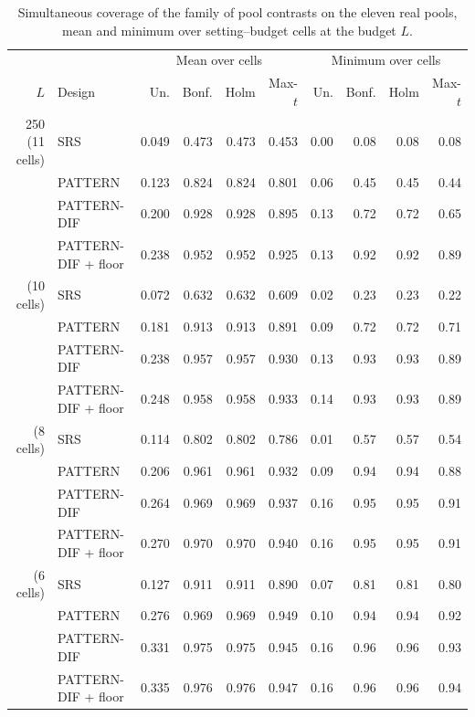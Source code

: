 \documentclass[pdflatex,sn-mathphys-num,iicol]{sn-jnl}
\theoremstyle{thmstyleone}
\theoremstyle{thmstyletwo}
\theoremstyle{thmstylethree}
\begin{document}
\begin{table}[t]
\centering\footnotesize
\caption{Simultaneous coverage of the family of pool contrasts on the eleven real pools, mean and minimum over setting--budget cells at the budget $L$.}\label{tab:test-real-cover-summary}
\begin{tabular}{rl rrrr rrrr}\toprule
 & & \multicolumn{4}{c}{Mean over cells} & \multicolumn{4}{c}{Minimum over cells} \\
$L$ & Design & Un. & Bonf. & Holm & Max-$t$ & Un. & Bonf. & Holm & Max-$t$ \\\midrule
250 (11 cells) & SRS & 0.049 & 0.473 & 0.473 & 0.453 & 0.00 & 0.08 & 0.08 & 0.08 \\
 & PATTERN & 0.123 & 0.824 & 0.824 & 0.801 & 0.06 & 0.45 & 0.45 & 0.44 \\
 & PATTERN-DIF & 0.200 & 0.928 & 0.928 & 0.895 & 0.13 & 0.72 & 0.72 & 0.65 \\
 & PATTERN-DIF + floor & 0.238 & 0.952 & 0.952 & 0.925 & 0.13 & 0.92 & 0.92 & 0.89 \\
\addlinespace
500 (10 cells) & SRS & 0.072 & 0.632 & 0.632 & 0.609 & 0.02 & 0.23 & 0.23 & 0.22 \\
 & PATTERN & 0.181 & 0.913 & 0.913 & 0.891 & 0.09 & 0.72 & 0.72 & 0.71 \\
 & PATTERN-DIF & 0.238 & 0.957 & 0.957 & 0.930 & 0.13 & 0.93 & 0.93 & 0.89 \\
 & PATTERN-DIF + floor & 0.248 & 0.958 & 0.958 & 0.933 & 0.14 & 0.93 & 0.93 & 0.89 \\
\addlinespace
1000 (8 cells) & SRS & 0.114 & 0.802 & 0.802 & 0.786 & 0.01 & 0.57 & 0.57 & 0.54 \\
 & PATTERN & 0.206 & 0.961 & 0.961 & 0.932 & 0.09 & 0.94 & 0.94 & 0.88 \\
 & PATTERN-DIF & 0.264 & 0.969 & 0.969 & 0.937 & 0.16 & 0.95 & 0.95 & 0.91 \\
 & PATTERN-DIF + floor & 0.270 & 0.970 & 0.970 & 0.940 & 0.16 & 0.95 & 0.95 & 0.91 \\
\addlinespace
2000 (6 cells) & SRS & 0.127 & 0.911 & 0.911 & 0.890 & 0.07 & 0.81 & 0.81 & 0.80 \\
 & PATTERN & 0.276 & 0.969 & 0.969 & 0.949 & 0.10 & 0.94 & 0.94 & 0.92 \\
 & PATTERN-DIF & 0.331 & 0.975 & 0.975 & 0.945 & 0.16 & 0.96 & 0.96 & 0.93 \\
 & PATTERN-DIF + floor & 0.335 & 0.976 & 0.976 & 0.947 & 0.16 & 0.96 & 0.96 & 0.94 \\
\bottomrule\end{tabular}

\end{table}
\end{document}
